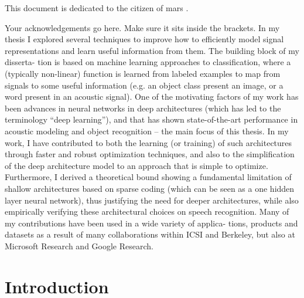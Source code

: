 \documentclass[phd,tocprelim]{cornell}
\begin{document}

\begin{dedication}
This document is dedicated to the citizen of mars .
\end{dedication}

\begin{acknowledgements}
Your acknowledgements go here. Make sure it sits inside the brackets.
In my thesis I explored several techniques to improve how to efficiently model signal
representations and learn useful information from them.  The building block of my disserta-
tion is based on machine learning approaches to classification, where a (typically non-linear)
function is learned from labeled examples to map from signals to some useful information
(e.g.  an object class present an image, or a word present in an acoustic signal).  One of the
motivating factors of my work has been advances in neural networks in deep architectures
(which  has  led  to  the  terminology  “deep  learning”),  and  that  has  shown  state-of-the-art
performance in acoustic modeling and object recognition – the main focus of this thesis.
In  my  work,  I  have  contributed  to  both  the  learning  (or  training)  of  such  architectures
through  faster  and  robust  optimization  techniques,  and  also  to  the  simplification  of  the
deep architecture model to an approach that is simple to optimize.  Furthermore, I derived
a  theoretical  bound  showing  a  fundamental  limitation  of  shallow  architectures  based  on
sparse coding (which can be seen as a one hidden layer neural network), thus justifying the
need for deeper architectures, while also empirically verifying these architectural choices on
speech recognition.  Many of my contributions have been used in a wide variety of applica-
tions, products and datasets as a result of many collaborations within ICSI and Berkeley,
but also at Microsoft Research and Google Research.
\end{acknowledgements}

\contentspage
\tablelistpage
\figurelistpage

\normalspacing \setcounter{page}{1} 
\pagestyle{cornell} \addtolength{\parskip}{0.5\baselineskip}

\chapter{Introduction}
\end{document}
